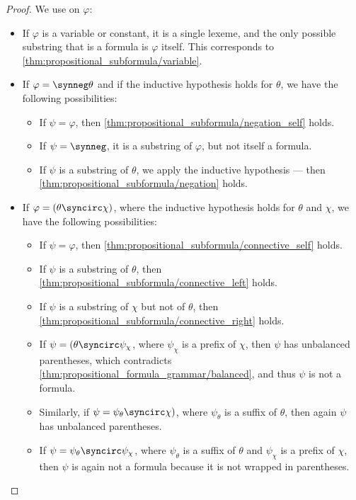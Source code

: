 \begin{proof}
  We use  on \( \varphi \):
  \begin{itemize}
    \item If \( \varphi \) is a variable or constant, it is a single lexeme, and the only possible substring that is a formula is \( \varphi \) itself. This corresponds to \cref{thm:propositional_subformula/variable}.
    \item If \( \varphi = \synneg \theta \) and if the inductive hypothesis holds for \( \theta \), we have the following possibilities:
    \begin{itemize}
      \item If \( \psi = \varphi \), then \cref{thm:propositional_subformula/negation_self} holds.
      \item If \( \psi = \synneg \), it is a substring of \( \varphi \), but not itself a formula.
      \item If \( \psi \) is a substring of \( \theta \), we apply the inductive hypothesis --- then \cref{thm:propositional_subformula/negation} holds.
    \end{itemize}

    \item If \( \varphi = (\theta \syncirc \chi) \), where the inductive hypothesis holds for \( \theta \) and \( \chi \), we have the following possibilities:
    \begin{itemize}
      \item If \( \psi = \varphi \), then \cref{thm:propositional_subformula/connective_self} holds.
      \item If \( \psi \) is a substring of \( \theta \), then \cref{thm:propositional_subformula/connective_left} holds.
      \item If \( \psi \) is a substring of \( \chi \) but not of \( \theta \), then \cref{thm:propositional_subformula/connective_right} holds.
      \item If \( \psi = (\theta \syncirc \psi_\chi \), where \( \psi_\chi \) is a prefix of \( \chi \), then \( \psi \) has unbalanced parentheses, which contradicts \cref{thm:propositional_formula_grammar/balanced}, and thus \( \psi \) is not a formula.
      \item Similarly, if \( \psi = \psi_\theta \syncirc \chi) \), where \( \psi_\theta \) is a suffix of \( \theta \), then again \( \psi \) has unbalanced parentheses.
      \item If \( \psi = \psi_\theta \syncirc \psi_\chi \), where \( \psi_\theta \) is a suffix of \( \theta \) and \( \psi_\chi \) is a prefix of \( \chi \), then \( \psi \) is again not a formula because it is not wrapped in parentheses.
    \end{itemize}
  \end{itemize}
\end{proof}

